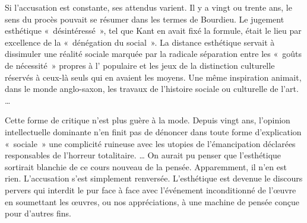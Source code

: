 \documentclass[11pt,twoside,openany]{book}
\newenvironment{lateiDocument}{}{}
\begin{document}
\begin{lateiDocument}
\begin{teiElement}[name={TEI},change={commons\_edition}]
\begin{teiElement}[name={text},type={book},xmlid={book}]
\begin{teiElement}[name={group},type={book},xmlid={book-001}]
\begin{teiElement}[name={group},type={section1},xmlid={section1-001}]
\begin{teiElement}
\begin{teiElement}[name={body},xmlid={body-005}]
\begin{teiDiv}[type={section1},xmlid={div01-2}]
\begin{teiCit}[xmlid={cit02-3}]
                \begin{teiQuote}
Si l’accusation est constante, ses attendus varient. Il y a vingt ou trente ans, le sens du procès pouvait se résumer dans les termes de Bourdieu. Le jugement esthétique « désintéressé », tel que Kant en avait fixé la formule, était le lieu par excellence de la « dénégation du social ». La distance esthétique servait à dissimuler une réalité sociale marquée par la radicale séparation entre les « goûts de nécessité » propres à l’ populaire et les jeux de la distinction culturelle réservés à ceux-là seuls qui en avaient les moyens. Une même inspiration animait, dans le monde anglo-saxon, les travaux de l’histoire sociale ou culturelle de l’art. \lbrack{}…\rbrack{}
\end{teiQuote}
              
\end{teiCit}
              \begin{teiCit}[xmlid={cit03-3}]

                \begin{teiQuote}
Cette forme de critique n’est plus guère à la mode. Depuis vingt ans, l’opinion intellectuelle dominante n’en finit pas de dénoncer dans toute forme d’explication « sociale » une complicité ruineuse avec les utopies de l’émancipation déclarées responsables de l’horreur totalitaire. \lbrack{}…\rbrack{} On aurait pu penser que l’esthétique sortirait blanchie de ce cours nouveau de la pensée. Apparemment, il n’en est rien. L’accusation s’est simplement renversée. L’esthétique est devenue le discours pervers qui interdit \lbrack{}le pur\rbrack{} face à face \lbrack{}avec l’événement inconditionné de l’œuvre\rbrack{} en soumettant les œuvres, ou nos appréciations, à une machine de pensée conçue pour d’autres fins.
\end{teiQuote}
              

\end{teiCit}
\end{teiDiv}
\end{teiElement}
\end{teiElement}
\end{teiElement}
\end{teiElement}
\end{teiElement}
\end{teiElement}
\end{lateiDocument}
\end{document}
